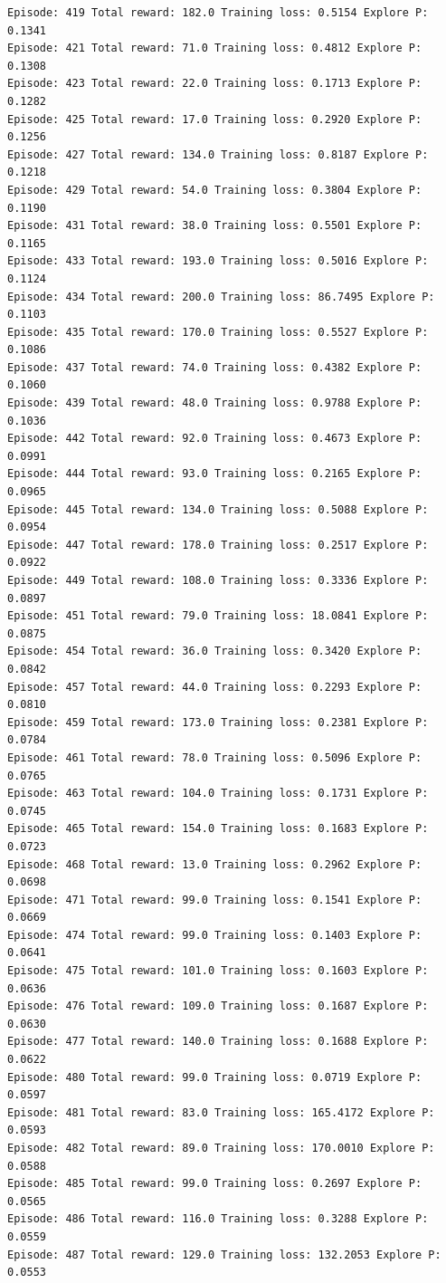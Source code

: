\documentclass[11pt]{article}
\begin{document}
\begin{Verbatim}[commandchars=\\\{\}]
Episode: 419 Total reward: 182.0 Training loss: 0.5154 Explore P: 0.1341
Episode: 421 Total reward: 71.0 Training loss: 0.4812 Explore P: 0.1308
Episode: 423 Total reward: 22.0 Training loss: 0.1713 Explore P: 0.1282
Episode: 425 Total reward: 17.0 Training loss: 0.2920 Explore P: 0.1256
Episode: 427 Total reward: 134.0 Training loss: 0.8187 Explore P: 0.1218
Episode: 429 Total reward: 54.0 Training loss: 0.3804 Explore P: 0.1190
Episode: 431 Total reward: 38.0 Training loss: 0.5501 Explore P: 0.1165
Episode: 433 Total reward: 193.0 Training loss: 0.5016 Explore P: 0.1124
Episode: 434 Total reward: 200.0 Training loss: 86.7495 Explore P: 0.1103
Episode: 435 Total reward: 170.0 Training loss: 0.5527 Explore P: 0.1086
Episode: 437 Total reward: 74.0 Training loss: 0.4382 Explore P: 0.1060
Episode: 439 Total reward: 48.0 Training loss: 0.9788 Explore P: 0.1036
Episode: 442 Total reward: 92.0 Training loss: 0.4673 Explore P: 0.0991
Episode: 444 Total reward: 93.0 Training loss: 0.2165 Explore P: 0.0965
Episode: 445 Total reward: 134.0 Training loss: 0.5088 Explore P: 0.0954
Episode: 447 Total reward: 178.0 Training loss: 0.2517 Explore P: 0.0922
Episode: 449 Total reward: 108.0 Training loss: 0.3336 Explore P: 0.0897
Episode: 451 Total reward: 79.0 Training loss: 18.0841 Explore P: 0.0875
Episode: 454 Total reward: 36.0 Training loss: 0.3420 Explore P: 0.0842
Episode: 457 Total reward: 44.0 Training loss: 0.2293 Explore P: 0.0810
Episode: 459 Total reward: 173.0 Training loss: 0.2381 Explore P: 0.0784
Episode: 461 Total reward: 78.0 Training loss: 0.5096 Explore P: 0.0765
Episode: 463 Total reward: 104.0 Training loss: 0.1731 Explore P: 0.0745
Episode: 465 Total reward: 154.0 Training loss: 0.1683 Explore P: 0.0723
Episode: 468 Total reward: 13.0 Training loss: 0.2962 Explore P: 0.0698
Episode: 471 Total reward: 99.0 Training loss: 0.1541 Explore P: 0.0669
Episode: 474 Total reward: 99.0 Training loss: 0.1403 Explore P: 0.0641
Episode: 475 Total reward: 101.0 Training loss: 0.1603 Explore P: 0.0636
Episode: 476 Total reward: 109.0 Training loss: 0.1687 Explore P: 0.0630
Episode: 477 Total reward: 140.0 Training loss: 0.1688 Explore P: 0.0622
Episode: 480 Total reward: 99.0 Training loss: 0.0719 Explore P: 0.0597
Episode: 481 Total reward: 83.0 Training loss: 165.4172 Explore P: 0.0593
Episode: 482 Total reward: 89.0 Training loss: 170.0010 Explore P: 0.0588
Episode: 485 Total reward: 99.0 Training loss: 0.2697 Explore P: 0.0565
Episode: 486 Total reward: 116.0 Training loss: 0.3288 Explore P: 0.0559
Episode: 487 Total reward: 129.0 Training loss: 132.2053 Explore P: 0.0553

\end{Verbatim}
\end{document}
